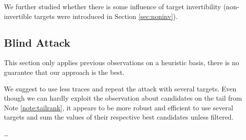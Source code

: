 	We further studied whether there is some influence of target invertibility (non-invertible targets were introduced in Section \ref{sec:noninv}).
	



\subsection{Blind Attack}
\label{sec:subblindattack}

\begin{note}
	This section only applies previous observations on a heuristic basis, there is no guarantee that our approach is the best.
\end{note}

We suggest to use less traces and repeat the attack with several targets. Even though we can hardly exploit the observation about candidates on the tail from Note \ref{note:tailrank}, it appears to be more robust and efficient to use several targets and sum the values of their respective best candidates unless filtered.

\ldots




